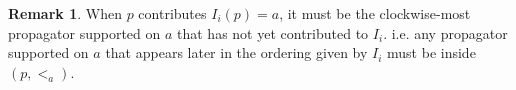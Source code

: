 \documentclass[11pt]{article}
\newcommand{\cP}{\mathcal{P}}
\theoremstyle{remark}
\theoremstyle{definition}
\newtheorem{dfn}[thm]{Definition}
\newtheorem{rmk}[thm]{Remark}
\begin{document}
%


\begin{rmk} \label{clockwise ordering rem}
When $p$ contributes $I_i(p) = a$, it must be the clockwise-most propagator supported on $a$ that has not yet contributed to $I_i$. i.e. any propagator supported on $a$ that appears later in the ordering given by $I_i$ must be inside $(p, <_{a})$.
\end{rmk} 
\end{document}
